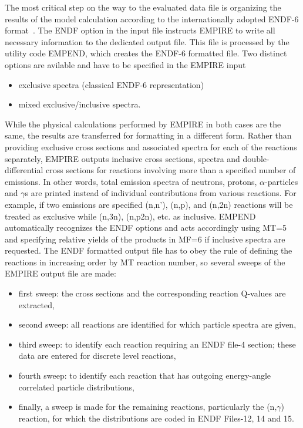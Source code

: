 \documentclass[twocolumn,amsmath,amssymb,10pt,groupedaddress,a4paper]{revtex4}
\begin{document}
The most critical step on the way to the evaluated data file is organizing the results of the model calculation according to the internationally adopted ENDF-6 format~\cite{ENDF-102}.
The ENDF option in the input file instructs EMPIRE to
write all necessary information to the dedicated output file.
This file is processed by the utility
code EMPEND, which creates the ENDF-6 formatted file.
Two distinct options are avilable and have to be specified in the EMPIRE input
\begin{itemize}
\item exclusive spectra (classical ENDF-6 representation)
\item mixed exclusive/inclusive spectra.
\end{itemize}
While the physical calculations performed by EMPIRE in both
cases are the same, the results are transferred for formatting in
a different form. Rather than providing exclusive cross sections and
associated spectra for each of the reactions separately, EMPIRE outputs
inclusive cross sections, spectra and double-differential cross sections for
reactions involving more than a specified number of emissions.
In other words, total emission spectra of neutrons, protons, $\alpha$-particles
and $\gamma$s are printed instead of individual contributions from
various reactions. For example, if two
emissions are specified (n,n'), (n,p), and (n,2n) reactions will be treated as exclusive while
(n,3n), (n,p2n), etc. as inclusive.
EMPEND automatically recognizes
the ENDF options and acts accordingly using MT=5 and specifying relative
yields of the products in MF=6 if inclusive spectra are requested.
The ENDF formatted
output file has to obey the rule of defining the reactions in increasing
order by MT reaction number, so several sweeps of the EMPIRE output file
are made:
\begin{itemize}
\item first sweep: the cross sections and the corresponding reaction Q-values
are extracted,
\item second sweep: all reactions are identified for which particle spectra
are given,
\item third sweep: to identify each reaction requiring an ENDF file-4 section;
these data are entered for discrete level reactions,
\item fourth sweep: to identify each reaction that has outgoing energy-angle
correlated particle distributions,
\item finally, a sweep is made for the remaining reactions, particularly
the (n,$\gamma$) reaction, for which the distributions are coded
in ENDF Files-12, 14 and 15.
\end{itemize}
\end{document}
